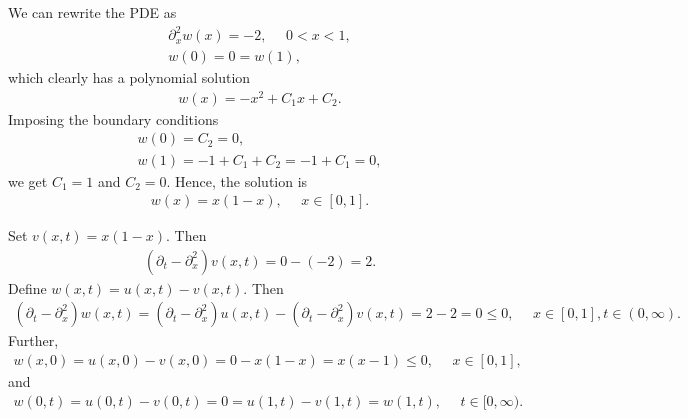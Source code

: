 \begin{questions}
\begin{solution}
We can rewrite the PDE as
\begin{align*}
\partial_x^2w(x)=-2,~~~~~~0<x<1,\\
w(0)=0=w(1),
\end{align*}
which clearly has a polynomial solution
\begin{align*}
w(x)=-x^2+C_1x+C_2.
\end{align*}
Imposing the boundary conditions
\begin{align*}
w(0)=C_2=0,\\
w(1)=-1+C_1+C_2=-1+C_1=0,
\end{align*}
we get $C_1=1$ and $C_2=0$. Hence, the solution is
\begin{align*}
w(x)=x(1-x),~~~~~~x\in[0,1].
\end{align*}
\end{solution}
\begin{solution}
Set $v(x,t)=x(1-x)$. Then
\begin{align*}
(\partial_t-\partial_x^2)v(x,t)=0-(-2)=2.
\end{align*}
Define $w(x,t)=u(x,t)-v(x,t)$. Then
\begin{align*}
(\partial_t-\partial_x^2)w(x,t)=(\partial_t-\partial_x^2)u(x,t)-(\partial_t-\partial_x^2)v(x,t)=2-2=0\leq 0,~~~~~~x\in[0,1],t\in(0,\infty).
\end{align*}
Further,
\begin{align*}
w(x,0)=u(x,0)-v(x,0)=0-x(1-x)=x(x-1)\leq 0,~~~~~~x\in[0,1],
\end{align*}
and
\begin{align*}
w(0,t)=u(0,t)-v(0,t)=0=u(1,t)-v(1,t)=w(1,t),~~~~~~t\in[0,\infty).

\end{align*}
\end{solution}
\end{questions}
